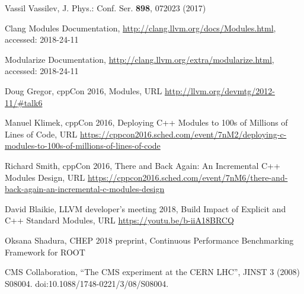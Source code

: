 \documentclass[12pt]{iopart}
\begin{document}
\begin{thebibliography}{10}
Vassil Vassilev, J. Phys.: Conf. Ser. \textbf{898}, 072023 (2017)

Clang Modules Documentation, \url{http://clang.llvm.org/docs/Modules.html}, accessed: 2018-24-11

Modularize Documentation, \url{http://clang.llvm.org/extra/modularize.html}, accessed: 2018-24-11

Doug Gregor, cppCon 2016, Modules, URL \url{http://llvm.org/devmtg/2012-11/#talk6}

Manuel Klimek, cppCon 2016, Deploying C++ Modules to 100s of Millions of Lines of Code, URL \url{https://cppcon2016.sched.com/event/7nM2/deploying-c-modules-to-100s-of-millions-of-lines-of-code}

Richard Smith, cppCon 2016, There and Back Again: An Incremental C++ Modules Design, URL \url{https://cppcon2016.sched.com/event/7nM6/there-and-back-again-an-incremental-c-modules-design}

David Blaikie, LLVM developer's meeting 2018, Build Impact of Explicit and C++ Standard Modules, URL \url{https://youtu.be/b-iiA18BRCQ}

Oksana Shadura, CHEP 2018 preprint, Continuous Performance Benchmarking Framework for ROOT

CMS Collaboration, “The CMS experiment at the CERN LHC”, JINST 3 (2008) S08004. doi:10.1088/1748-0221/3/08/S08004.

\end{thebibliography}
\end{document}
